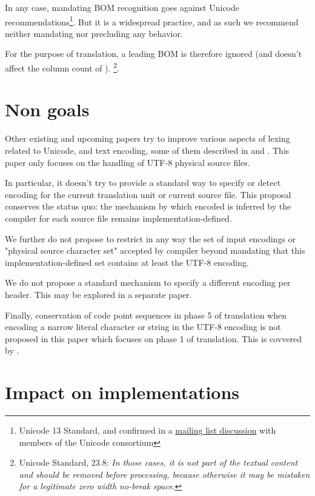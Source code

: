 \documentclass{wg21}
\begin{document}
In any case, mandating BOM recognition goes against Unicode recommendations\footnote{Unicode 13 Standard, and confirmed in a \href{https://corp.unicode.org/mailman/private/unicode/2020-June/008716.html}{mailing list discussion} with members of the Unicode consortium}. But it is a widespread practice, and as such we recommend neither mandating nor precluding any behavior.

\pagebreak

For the purpose of translation, a leading BOM is therefore ignored (and doesn't affect the column count of ).
\footnote{Unicode Standard, 23.8: \emph{In those cases, it is not part of the textual content and should be removed before processing, because otherwise it may be mistaken for a legitimate zero width no-break space}.}.

\section{Non goals}

Other existing and upcoming papers try to improve various aspects of lexing related to Unicode, and text encoding, some of them described in 
and .
This paper only focuses on the handling of UTF-8 physical source files.

In particular, it doesn't try to provide a standard  way to specify or detect encoding for the current translation unit or current source file. This proposal conserves the status quo: the mechanism by which encoded is inferred by the compiler for each source file remains implementation-defined.

We further do not propose to restrict in any way the set of input encodings or "physical source character set"
accepted by compiler beyond mandating that this implementation-defined set contains at least the UTF-8 encoding.

We do not propose a standard mechanism to specify a different encoding per header. This may be explored in a separate paper.

Finally, conservation of code point sequences in phase 5 of translation when encoding a narrow literal character or string in the UTF-8
encoding is not proposed in this paper which focuses on phase 1 of translation.
This is covvered by .




\section{Impact on implementations}
\end{document}
